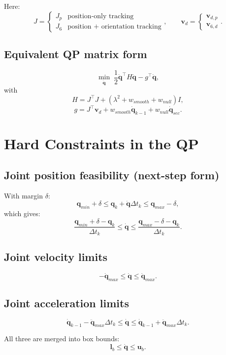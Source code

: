 \documentclass[11pt,a4paper]{article}
\begin{document}
Here:
\[
J=
\begin{cases}
J_p & \text{position-only tracking}\\
J_6 & \text{position + orientation tracking}
\end{cases},
\qquad
\mathbf{v}_d=
\begin{cases}
\mathbf{v}_{d,p}\\
\mathbf{v}_{6,d}
\end{cases}.
\]

\subsection{Equivalent QP matrix form}
\[
\min_{\dot{\mathbf{q}}}\;
\frac12\dot{\mathbf{q}}^\top H\dot{\mathbf{q}}-g^\top\dot{\mathbf{q}},
\]
with
\[
H=J^\top J + \left(\lambda^2+w_{smooth}+w_{null}\right)I,
\]
\[
g=J^\top\mathbf{v}_d + w_{smooth}\dot{\mathbf{q}}_{k-1} + w_{null}\dot{\mathbf{q}}_{sec}.
\]

\section{Hard Constraints in the QP}

\subsection{Joint position feasibility (next-step form)}
With margin \(\delta\):
\[
\mathbf{q}_{min}+\delta \le \mathbf{q}_k+\dot{\mathbf{q}}\Delta t_k \le \mathbf{q}_{max}-\delta,
\]
which gives:
\[
\frac{\mathbf{q}_{min}+\delta-\mathbf{q}_k}{\Delta t_k}
\le \dot{\mathbf{q}} \le
\frac{\mathbf{q}_{max}-\delta-\mathbf{q}_k}{\Delta t_k}.
\]

\subsection{Joint velocity limits}
\[
-\dot{\mathbf{q}}_{max}\le \dot{\mathbf{q}}\le \dot{\mathbf{q}}_{max}.
\]

\subsection{Joint acceleration limits}
\[
\dot{\mathbf{q}}_{k-1}-\ddot{\mathbf{q}}_{max}\Delta t_k
\le
\dot{\mathbf{q}}
\le
\dot{\mathbf{q}}_{k-1}+\ddot{\mathbf{q}}_{max}\Delta t_k.
\]

All three are merged into box bounds:
\[
\mathbf{l}_b \le \dot{\mathbf{q}} \le \mathbf{u}_b.
\]
\end{document}
